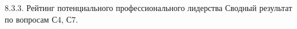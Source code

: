 \begin{frame}{8.3.3. Рейтинг потенциального профессионального лидерства}
\tiny 
Сводный результат по вопросам С4, С7.

\fontsize{5pt}{5}\selectfont
\begin{center}
\begin{tabular}{cllc}

\end{tabular}
\end{center}
\end{frame}


